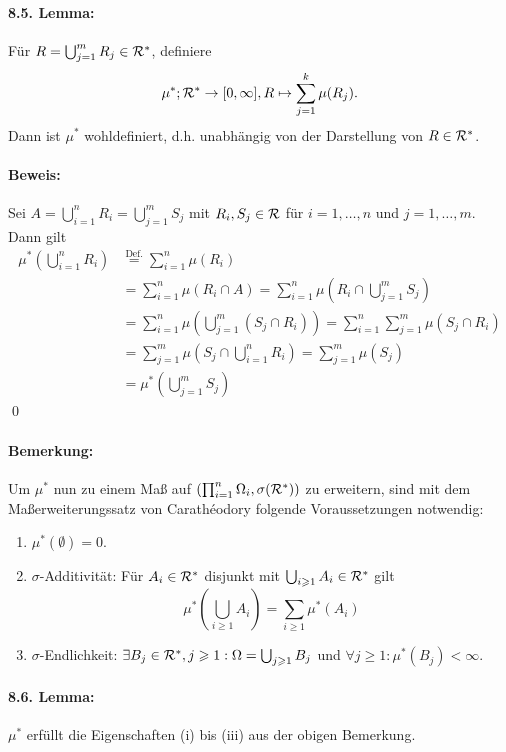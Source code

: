\paragraph{8.5. Lemma:} F\"ur $R=\bigcup_{j=1}^mR_j\in\mathcal{R}^*$, definiere 
$$\mu^*;\mathcal{R}^*\to[0,\infty],R\mapsto\sum_{j=1}^k\mu(R_j).$$
Dann ist $\mu^*$ wohldefiniert, d.h. unabh\"angig von der Darstellung von $R\in\mathcal{R}^*$.

\paragraph{Beweis:}Sei $A=\bigcup_{i=1}^n R_i=\bigcup_{j=1}^mS_j$ mit $R_i,S_j\in\mathcal{R}$ f\"ur $i=1,\hdots,n$ und $j=1,\hdots,m$. Dann gilt
\begin{align*}
    \mu^*\left(\bigcup_{i=1}^nR_i\right)&\overset{\text{Def.}}{=}\sum_{i=1}^n\mu(R_i)\\
    &=\sum_{i=1}^n\mu(R_i\cap A)
    =\sum_{i=1}^n\mu\left(R_i\cap \bigcup_{j=1}^mS_j\right) \\
    &=\sum_{i=1}^n\mu\left(\bigcup_{j=1}^m(S_j\cap R_i)\right)
    =\sum_{i=1}^n\sum_{j=1}^m\mu\left(S_j\cap R_i\right)\\
    &=\sum_{j=1}^m\mu\left(S_j\cap \bigcup_{i=1}^nR_i\right)=\sum_{j=1}^m\mu(S_j)\\
    &=\mu^*\left(\bigcup_{j=1}^mS_j\right)
\end{align*}
\qed

\paragraph{Bemerkung:}Um $\mu^*$ nun zu einem Ma\ss{} auf $(\prod_{i=1}^n\Omega_i,\sigma(\mathcal{R}^*))$ zu erweitern, sind mit dem Ma\ss{}erweiterungssatz von Carath\'eodory folgende Voraussetzungen notwendig:
\begin{enumerate}[label=(\roman*)]
    \item $\mu^*(\emptyset)=0$.
    \item $\sigma$-Additivit\"at: F\"ur $A_i\in\mathcal{R}^*$ disjunkt mit $\bigcup_{i\geqslant1}A_i\in\mathcal{R}^*$ gilt 
    $$\mu^*\left(\bigcup_{i\geq1}A_i\right)=\sum_{i\geq1}\mu^*(A_i)$$
    \item $\sigma$-Endlichkeit: $\exists B_j\in\mathcal{R}^*,j\geqslant1:\Omega=\bigcup_{j\geqslant1}B_j$ und $\forall j\geq1:\mu^*(B_j)<\infty$.
\end{enumerate}

\paragraph{8.6. Lemma:} $\mu^*$ erf\"ullt die Eigenschaften (i) bis (iii) aus der obigen Bemerkung.
